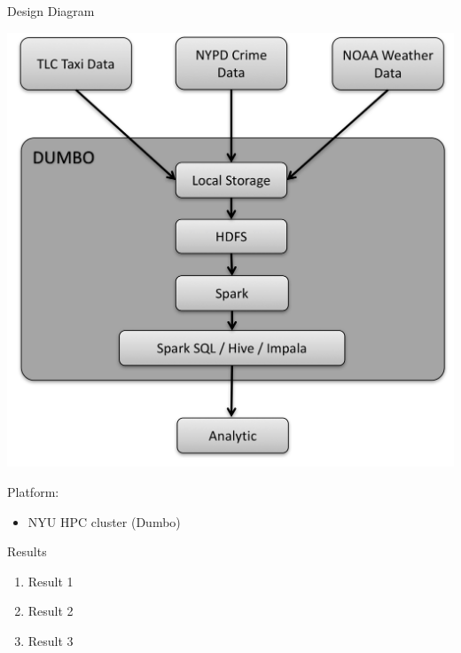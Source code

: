\documentclass[10pt,ignorenonframetext,]{beamer}
\providecommand{\tightlist}{%
  \setlength{\itemsep}{0pt}\setlength{\parskip}{0pt}}
\begin{document}
\begin{frame}{%
\protect\hypertarget{design-diagram}{%
Design Diagram}}

\begin{center}
\includegraphics[height=.6\textheight]{img/DesignFlowDiagram.jpg}
\end{center}

\begin{block}{Platform:}

\begin{itemize}
\tightlist
\item
  NYU HPC cluster (Dumbo)
\end{itemize}

\end{block}

\end{frame}

\begin{frame}{%
\protect\hypertarget{results}{%
Results}}

\begin{enumerate}
[1.]
\item
  Result 1
\item
  Result 2
\item
  Result 3
\end{enumerate}

\end{frame}
\end{document}

